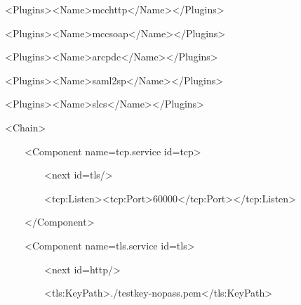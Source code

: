 \documentclass{article}
\begin{document}
{\ttfamily\color{black}
\ \ \ \ {\textless}Plugins{\textgreater}{\textless}Name{\textgreater}mcchttp{\textless}/Name{\textgreater}{\textless}/Plugins{\textgreater}}

{\ttfamily\color{black}
\ \ \ \ {\textless}Plugins{\textgreater}{\textless}Name{\textgreater}mccsoap{\textless}/Name{\textgreater}{\textless}/Plugins{\textgreater}}

{\ttfamily\color{black}
\ \ \ \ {\textless}Plugins{\textgreater}{\textless}Name{\textgreater}arcpdc{\textless}/Name{\textgreater}{\textless}/Plugins{\textgreater}}

{\ttfamily\color{black}
\ \ \ \ {\textless}Plugins{\textgreater}{\textless}Name{\textgreater}saml2sp{\textless}/Name{\textgreater}{\textless}/Plugins{\textgreater}}

{\ttfamily\color{black}
\ \ \ \ {\textless}Plugins{\textgreater}{\textless}Name{\textgreater}slcs{\textless}/Name{\textgreater}{\textless}/Plugins{\textgreater}}

{\ttfamily\color{black}
\ \ \ \ {\textless}Chain{\textgreater}}

{\ttfamily\color{black}
\ \ \ \ \ \ \ \ {\textless}Component
name={\textquotedbl}tcp.service{\textquotedbl}
id={\textquotedbl}tcp{\textquotedbl}{\textgreater}}

{\ttfamily\color{black}
\ \ \ \ \ \ \ \ \ \ \ \ {\textless}next
id={\textquotedbl}tls{\textquotedbl}/{\textgreater}}

{\ttfamily\color{black}
\ \ \ \ \ \ \ \ \ \ \ \ {\textless}tcp:Listen{\textgreater}{\textless}tcp:Port{\textgreater}60000{\textless}/tcp:Port{\textgreater}{\textless}/tcp:Listen{\textgreater}}

{\ttfamily\color{black}
\ \ \ \ \ \ \ \ {\textless}/Component{\textgreater}}

{\ttfamily\color{black}
\ \ \ \ \ \ \ \ {\textless}Component
name={\textquotedbl}tls.service{\textquotedbl}
id={\textquotedbl}tls{\textquotedbl}{\textgreater}}

{\ttfamily\color{black}
\ \ \ \ \ \ \ \ \ \ \ \ {\textless}next
id={\textquotedbl}http{\textquotedbl}/{\textgreater}}

{\ttfamily\color{black}
\ \ \ \ \ \ \ \ \ \ \ \ {\textless}tls:KeyPath{\textgreater}./testkey-nopass.pem{\textless}/tls:KeyPath{\textgreater}}
\end{document}
